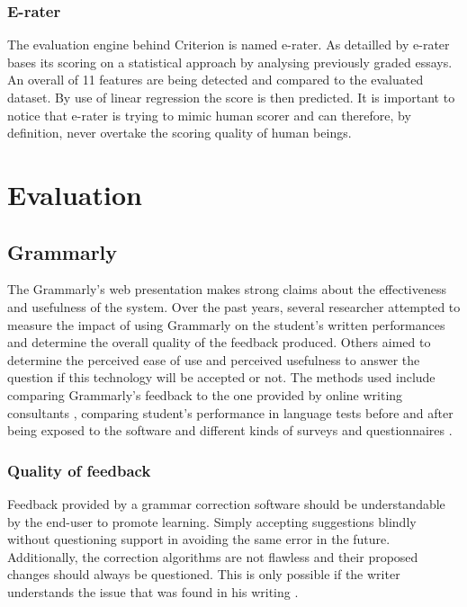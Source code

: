 \documentclass[runningheads]{llncs}
\let\OldTextregistered\textregistered
\renewcommand{\textregistered}{\OldTextregistered\xspace}%
\begin{document}
\subsubsection{E-rater}
The evaluation engine behind Criterion\textregistered is named e-rater\textregistered. As detailled by \textcite{lim_review_2012} e-rater\textregistered bases its scoring on a statistical approach by analysing previously graded essays. An overall of 11 features are being detected and compared to the evaluated dataset. By use of linear regression the score is then predicted. It is important to notice that e-rater\textregistered is trying to mimic human scorer and can therefore, by definition, never overtake the scoring quality of human beings. 


\section{Evaluation}

\subsection{Grammarly\textregistered}
The Grammarly\textregistered's web presentation \citep{noauthor_write_nodate} makes strong claims about the effectiveness and usefulness of the system. Over the past years, several researcher attempted to measure the impact of using Grammarly\textregistered on the student's written performances and determine the overall quality of the feedback produced. Others \citep{cavaleri_you_2016} aimed to determine the perceived ease of use and perceived usefulness to answer the question if this technology will be accepted or not. The methods used include comparing Grammarly\textregistered's feedback to the one provided by online writing consultants \citep{dembsey_closing_2017}, comparing student's performance in language tests before and after being exposed to the software \citep{qassemzadeh_impact_2016} and different kinds of surveys and questionnaires \citep{nova_utilizing_2018} \citep{cavaleri_you_2016} \citep{ventayen_graduate_2018}.

\subsubsection{Quality of feedback}
Feedback provided by a grammar correction software should be understandable by the end-user to promote learning. Simply accepting suggestions blindly without questioning support in avoiding the same error in the future. Additionally, the correction algorithms are not flawless and their proposed changes should always be questioned. This is only possible if the writer understands the issue that was found in his writing \citep{dembsey_closing_2017}.
\end{document}
